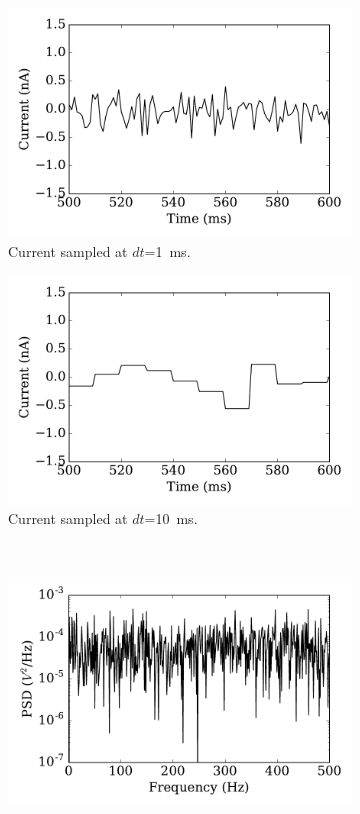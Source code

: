 \documentclass[runningheads,a4paper]{llncs}
\begin{document}
\begin{figure}[tbp!]
	\centering
	  \par
	\begin{subfigure}[t]{0.43\textwidth}
		\includegraphics[width=\textwidth]{curr_dt1.pdf}
		\caption{Current sampled at $dt$=1~ms.}
	\end{subfigure}
	\begin{subfigure}[t]{0.43\textwidth}
		\includegraphics[width=\textwidth]{curr_dt10.pdf}
		\caption{Current sampled at $dt$=10~ms.}
	\end{subfigure}\\
	\begin{subfigure}[t]{0.43\textwidth}
		\includegraphics[width=\textwidth]{psd_dt1.pdf}

\end{subfigure}
\end{figure}
\end{document}
